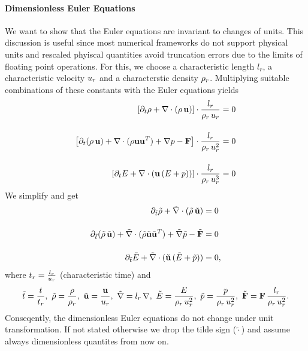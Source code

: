 \paragraph{Dimensionless Euler Equations} We want to show that the Euler
equations are invariant to changes of units. This discussion is useful since
most numerical frameworks do not support physical units and rescaled phyiscal
quantities avoid truncation errors due to the limits of floating point
operations. For this, we choose a characteristic length $l_r$, a characteristic
velocity $u_r$ and a characterstic density $\rho_r$. Multiplying suitable 
combinations of these constants with the Euler equations yields
\begin{align}
\left[\partial_t\rho + \nabla \cdot (\rho\,\mathbf{u})\right] \cdot \frac{l_r}{\rho_r\,u_r} &=  0\\[0.4cm]
\left[\partial_t(\rho\,\mathbf{u}) + \nabla\cdot(\rho\mathbf{u}\mathbf{u}^T) + \nabla p - \mathbf{F}\right] \cdot \frac{l_r}{\rho_r\,u_r^2} &= 0\\[0.4cm]
\left[\partial_t E + \nabla \cdot (\mathbf{u}\,(E + p))\right] \cdot \frac{l_r}{\rho_r\,u_r^3} &=  0
\end{align}
We simplify and get
\begin{align}
\partial_{\tilde{t}} \tilde{\rho} + \tilde{\nabla} \cdot (\tilde{\rho}\,\tilde{\mathbf{u}})   &=  0\\[0.4cm]
\partial_{\tilde{t}}(\tilde{\rho} \,\tilde{\mathbf{u}}) +      \tilde{\nabla}\cdot(\tilde{\rho}\tilde{\mathbf{u}}\tilde{\mathbf{u}}^T) + \tilde{\nabla} \tilde{p} - \tilde{\mathbf{F}}&= 0\\[0.4cm]
\partial_{\tilde{t}} \tilde{E} + \tilde{\nabla} \cdot (\tilde{\mathbf{u}}\,(\tilde{E} + \tilde{p})) &=  0,
\end{align}
where $t_r = \frac{l_r}{u_r}$ (characteristic time) and
\begin{equation}
\tilde{t} = \frac{t}{t_r},\ 
\tilde{\dens} = \frac{\dens}{\dens_r},\
\tilde{\velv} = \frac{\velv}{\vels_r},\ 
\tilde{\nabla} = l_r\,\nabla,\ 
\tilde{\Ener} = \frac{\Ener}{\dens_r\,\vels_r^2},\ 
\tilde{\pres} = \frac{\pres}{\dens_r\,\vels_r^2},\ 
\tilde{\vec{F}} = \vec{F} \, \frac{l_r}{\dens_r\,\vels_r^2}.
\end{equation}
Conseqently, the dimensionless Euler equations do not change under unit transformation. If not
stated otherwise we drop the tilde sign ($\tilde{\cdot}$) and assume always
dimensionless quantites from now on.

